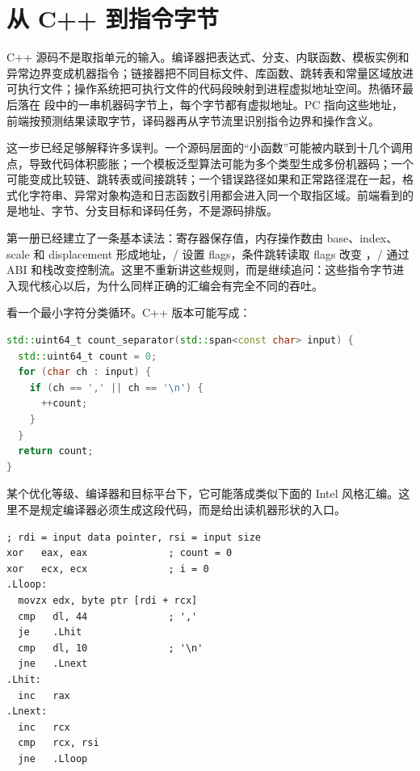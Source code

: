 \section{从 C++ 到指令字节}

C++ 源码不是取指单元的输入。编译器把表达式、分支、内联函数、模板实例和异常边界变成机器指令；链接器把不同目标文件、库函数、跳转表和常量区域放进可执行文件；操作系统把可执行文件的代码段映射到进程虚拟地址空间。热循环最后落在  段中的一串机器码字节上，每个字节都有虚拟地址。PC 指向这些地址，前端按预测结果读取字节，译码器再从字节流里识别指令边界和操作含义。

这一步已经足够解释许多误判。一个源码层面的“小函数”可能被内联到十几个调用点，导致代码体积膨胀；一个模板泛型算法可能为多个类型生成多份机器码；一个  可能变成比较链、跳转表或间接跳转；一个错误路径如果和正常路径混在一起，格式化字符串、异常对象构造和日志函数引用都会进入同一个取指区域。前端看到的是地址、字节、分支目标和译码任务，不是源码排版。

第一册已经建立了一条基本读法：寄存器保存值，内存操作数由 base、index、scale 和 displacement 形成地址，/ 设置 flags，条件跳转读取 flags 改变 ，/ 通过 ABI 和栈改变控制流。这里不重新讲这些规则，而是继续追问：这些指令字节进入现代核心以后，为什么同样正确的汇编会有完全不同的吞吐。

看一个最小字符分类循环。C++ 版本可能写成：

\begin{lstlisting}[language=C++,caption={字符分类的源码形状}]
std::uint64_t count_separator(std::span<const char> input) {
  std::uint64_t count = 0;
  for (char ch : input) {
    if (ch == ',' || ch == '\n') {
      ++count;
    }
  }
  return count;
}
\end{lstlisting}

某个优化等级、编译器和目标平台下，它可能落成类似下面的 Intel 风格汇编。这里不是规定编译器必须生成这段代码，而是给出读机器形状的入口。

\begin{lstlisting}[numbers=none,caption={同一循环可能出现的典型汇编形状}]
; rdi = input data pointer, rsi = input size
xor   eax, eax              ; count = 0
xor   ecx, ecx              ; i = 0
.Lloop:
  movzx edx, byte ptr [rdi + rcx]
  cmp   dl, 44              ; ','
  je    .Lhit
  cmp   dl, 10              ; '\n'
  jne   .Lnext
.Lhit:
  inc   rax
.Lnext:
  inc   rcx
  cmp   rcx, rsi
  jne   .Lloop
\end{lstlisting}

